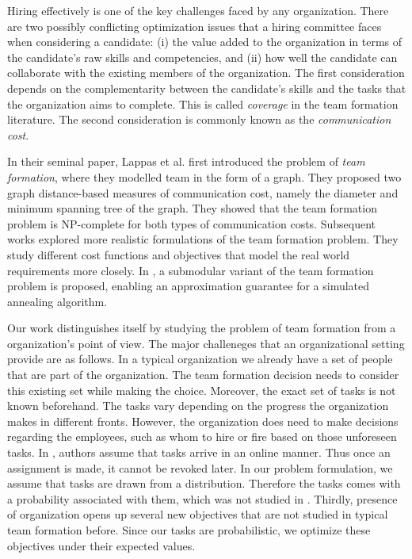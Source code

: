 Hiring effectively is one of the key challenges faced by any organization.
There are two possibly conflicting optimization issues that a hiring committee faces when considering a candidate: 
(i) the value added to the organization in terms of the candidate's raw skills and competencies, and 
(ii) how well the candidate can collaborate with the existing members of the organization.
The first consideration depends on the complementarity between the candidate's skills and the tasks that the organization aims to complete. 
This is called \textit{coverage} in the team formation literature.
The second consideration is commonly known as the \textit{communication cost}.

In their seminal paper, Lappas et al. \cite{lappas2009finding} first introduced the problem of \textit{team formation}, where they modelled team in the form of a graph.
They proposed two graph distance-based measures of communication cost, namely the diameter and minimum spanning tree of the graph. 
They showed that the team formation problem is NP-complete for both types of communication costs. 
Subsequent works \cite{sozio2010community, kargar2011discovering, anagnostopoulos2010power, rangapuram2013towards} explored more realistic formulations of the team  formation problem. They study different cost functions and objectives that model the real world requirements more closely.
In \cite{bhowmik2014submodularity}, a submodular variant of the team formation problem is proposed, enabling an approximation guarantee for a simulated annealing algorithm.

Our work distinguishes itself by studying the problem of team formation from a organization's point of view. The major challeneges that an organizational setting provide are as follows. In a typical organization we already have a set of people that are part of the organization. The team formation decision needs to consider this existing set while making the choice. Moreover, the exact set of tasks is not known beforehand. The tasks vary depending on the progress the organization makes in different fronts. However, the organization does need to make decisions regarding the employees, such as whom to hire or fire based on those unforeseen tasks. In \cite{anagnostopoulos2012online}, authors assume that tasks arrive in an online manner. Thus once an assignment is made, it cannot be revoked later. In our problem formulation, we assume that tasks are drawn from a distribution. Therefore the tasks comes with a probability associated with them, which was not studied in \cite{anagnostopoulos2012online}. Thirdly, presence of organization opens up several new objectives that are not studied in typical team formation before. Since our tasks are probabilistic, we optimize these objectives under their expected values. 

